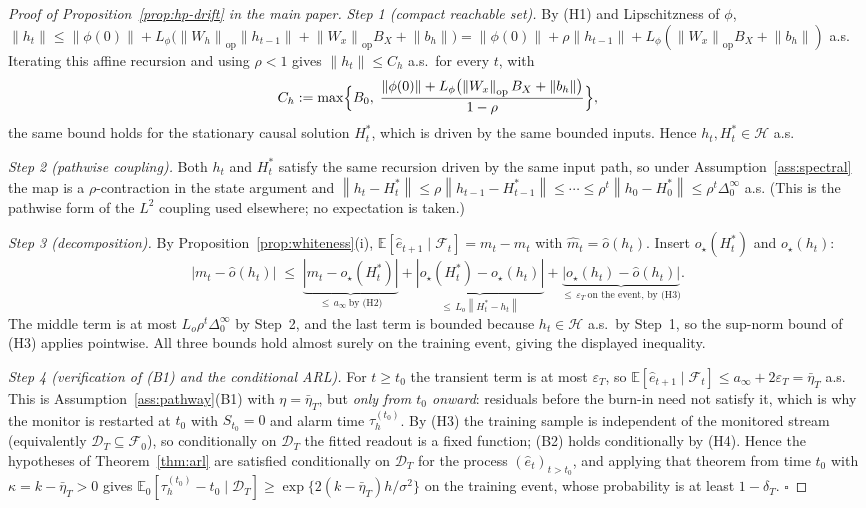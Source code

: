 \documentclass[bj,authoryear]{imsart}
\theoremstyle{plain}
\theoremstyle{definition}
\newcommand{\E}{\mathbb{E}}
\newcommand{\F}{\mathcal{F}}
\newcommand{\norm}[1]{\left\lVert #1 \right\rVert}
\begin{document}
\begin{proof}[Proof of Proposition~\ref{prop:hp-drift} in the main paper]
  \emph{Step 1 (compact reachable set).}  By (H1) and Lipschitzness of $\phi$,
  $\norm{h_t}\leq\norm{\phi(0)}+L_\phi\bigl(\norm{W_h}_{\mathrm{op}}\norm{h_{t-1}}
  +\norm{W_x}_{\mathrm{op}}B_X+\norm{b_h}\bigr)
  =\norm{\phi(0)}+\rho\norm{h_{t-1}}+L_\phi(\norm{W_x}_{\mathrm{op}}B_X+\norm{b_h})$
  a.s.  Iterating this affine recursion and using $\rho<1$ gives
  $\norm{h_t}\leq C_h$ a.s.\ for every $t$, with
  \[
    C_h:=\max\Bigl\{B_0,\;
      \frac{\norm{\phi(0)}+L_\phi\bigl(\norm{W_x}_{\mathrm{op}}B_X+\norm{b_h}\bigr)}{1-\rho}\Bigr\},
  \]
  the same
  bound holds for the stationary causal solution $H_t^*$, which is driven by
  the same bounded inputs.  Hence $h_t,H_t^*\in\mathcal H$ a.s.

  \emph{Step 2 (pathwise coupling).}  Both $h_t$ and $H_t^*$ satisfy the same
  recursion driven by the same input path, so under
  Assumption~\ref{ass:spectral} the map is a $\rho$-contraction in the state
  argument and
  $\norm{h_t-H_t^*}\leq\rho\norm{h_{t-1}-H_{t-1}^*}\leq\cdots\leq
  \rho^{t}\norm{h_0-H_0^*}\leq\rho^{t}\Delta_0^\infty$ a.s.  (This is the
  pathwise form of the $L^2$ coupling used elsewhere; no expectation is taken.)

  \emph{Step 3 (decomposition).}  By Proposition~\ref{prop:whiteness}(i),
  $\E[\hat e_{t+1}\mid\F_t]=m_t-\hat m_t$ with $\hat m_t=\hat o(h_t)$.  Insert
  $o_\star(H_t^*)$ and $o_\star(h_t)$:
  \[
    |m_t-\hat o(h_t)|
    \;\leq\;\underbrace{|m_t-o_\star(H_t^*)|}_{\leq\,a_\infty\ \text{by (H2)}}
    +\underbrace{|o_\star(H_t^*)-o_\star(h_t)|}_{\leq\,L_o\norm{H_t^*-h_t}}
    +\underbrace{|o_\star(h_t)-\hat o(h_t)|}_{\leq\,\varepsilon_T\ \text{on the event, by (H3)}} .
  \]
  The middle term is at most $L_o\rho^t\Delta_0^\infty$ by Step~2, and the last
  term is bounded because $h_t\in\mathcal H$ a.s.\ by Step~1, so the sup-norm
  bound of (H3) applies pointwise.  All three bounds hold almost surely on the
  training event, giving the displayed inequality.

  \emph{Step 4 (verification of (B1) and the conditional ARL).}  For $t\geq t_0$
  the transient term is at most $\varepsilon_T$, so
  $\E[\hat e_{t+1}\mid\F_t]\leq a_\infty+2\varepsilon_T=\bar\eta_T$ a.s.  This is
  Assumption~\ref{ass:pathway}(B1) with $\eta=\bar\eta_T$, but \emph{only from
  $t_0$ onward}: residuals before the burn-in need not satisfy it, which is why
  the monitor is restarted at $t_0$ with $S_{t_0}=0$ and alarm time
  $\tau_h^{(t_0)}$.  By (H3) the training sample is independent of the monitored
  stream (equivalently $\mathcal D_T\subseteq\F_0$), so conditionally on
  $\mathcal D_T$ the fitted readout is a fixed function; (B2) holds conditionally
  by (H4).  Hence the hypotheses of Theorem~\ref{thm:arl} are satisfied
  conditionally on $\mathcal D_T$ for the process $(\hat e_t)_{t>t_0}$, and
  applying that theorem from time $t_0$ with $\kappa=k-\bar\eta_T>0$ gives
  $\E_0[\tau_h^{(t_0)}-t_0\mid\mathcal D_T]\geq\exp\{2(k-\bar\eta_T)h/\sigma^2\}$
  on the training event, whose probability is at least $1-\delta_T$. $\square$
\end{proof}
\end{document}
